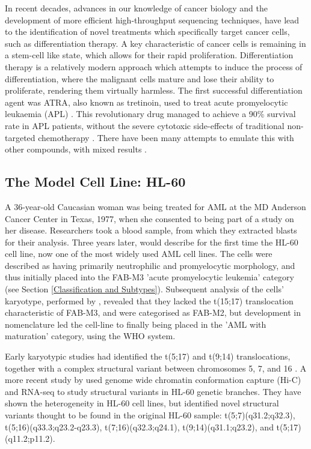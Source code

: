 In recent decades, advances in our knowledge of cancer biology and the development of more efficient high-throughput sequencing techniques, have lead to the identification of novel treatments which specifically target cancer cells, such as differentiation therapy. A key characteristic of cancer cells is remaining in a stem-cell like state, which allows for their rapid proliferation. Differentiation therapy is a relatively modern approach which attempts to induce the process of differentiation, where the malignant cells mature and lose their ability to proliferate, rendering them virtually harmless. The first successful differentiation agent was \ac{ATRA}, also known as tretinoin, used to treat acute promyelocytic leukaemia (APL) \citep{chomienne1990all}. This revolutionary drug managed to achieve a 90\% survival rate in APL patients, without the severe cytotoxic side-effects of traditional non-targeted chemotherapy \citep{kim2015selection}. There have been many attempts to emulate this with other compounds, with mixed results \citep{nowak2009differentiation}.

\subsection{The Model Cell Line: HL-60 }
A 36-year-old Caucasian woman was being treated for \ac{AML} at the MD Anderson Cancer Center in Texas, 1977, when she consented to being part of a study on her disease. Researchers took a blood sample, from which they extracted blasts for their analysis. Three years later, \cite{gallagher1979characterization} would describe for the first time the HL-60 cell line, now one of the most widely used \ac{AML} cell lines. The cells were described as having primarily neutrophilic and promyelocytic morphology, and thus initially placed into the \ac{FAB}-M3 'acute promyelocytic leukemia' category (see Section \ref{Classification and Subtypes}). Subsequent analysis of the cells' karyotype, performed by \cite{dalton1988hl}, revealed that they lacked the t(15;17) translocation characteristic of \ac{FAB}-M3, and were categorised as \ac{FAB}-M2, but development in nomenclature led the cell-line to finally being placed in the 'AML with maturation' category, using the \ac{WHO} system.

Early karyotypic studies had identified the t(5;17) \citep{von1990double} and t(9;14) translocations, together with a complex structural variant between chromosomes 5, 7, and 16 \citep{liang1999spectral}. A more recent study by \cite{jacob} used genome wide chromatin conformation capture (Hi-C) and RNA-seq to study structural variants in HL-60 genetic branches. They have shown the heterogeneity in HL-60 cell lines, but identified novel structural variants thought to be found in the original HL-60 sample: t(5;7)(q31.2;q32.3), t(5;16)(q33.3;q23.2-q23.3), t(7;16)(q32.3;q24.1), t(9;14)(q31.1;q23.2), and t(5;17)(q11.2;p11.2).

